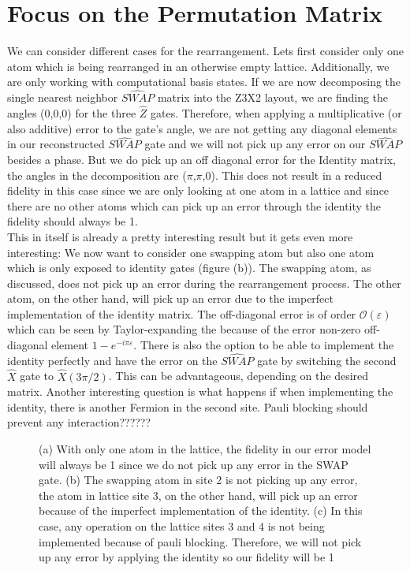 \section{Focus on the Permutation Matrix}
We can consider different cases for the rearrangement. Lets first consider only one atom which is being rearranged in an otherwise empty lattice. Additionally, we are only working with computational basis states. If we are now decomposing the single nearest neighbor $\widehat{SWAP}$ matrix into the Z3X2 layout, we are finding the angles (0,0,0) for the three $\widehat{Z}$ gates. Therefore, when applying a multiplicative (or also additive) error to the gate's angle, we are not getting any diagonal elements in our reconstructed $\widehat{SWAP}$ gate and we will not pick up any error on our $\widehat{SWAP}$ besides a phase. But we do pick up an off diagonal error for the Identity matrix, the angles in the decomposition are ($\pi$,$\pi$,0). This does not result in a reduced fidelity in this case since we are only looking at one atom in a lattice and since there are no other atoms which can pick up an error through the identity the fidelity should always be 1. \\
This in itself is already a pretty interesting result but it gets even more interesting: We now want to consider one swapping atom but also one atom which is only exposed to identity gates (figure (b)). The swapping atom, as discussed, does not pick up an error during the rearrangement process. The other atom, on the other hand, will pick up an error due to the imperfect implementation of the identity matrix. The off-diagonal error is of order $\mathcal{O}(\varepsilon)$ which can be seen by Taylor-expanding the because of the error non-zero off-diagonal element $1-e^{-i\pi\varepsilon}$. There is also the option to be able to implement the identity perfectly and have the error on the $\widehat{SWAP}$ gate by switching the second $\widehat{X}$ gate to $\widehat{X}(3\pi/2)$. This can be advantageous, depending on the desired matrix.
Another interesting question is what happens if when implementing the identity, there is another Fermion in the second site. Pauli blocking should prevent any interaction??????

\begin{figure}[t]
    \centering
    \caption[]{(a) With only one atom in the lattice, the fidelity in our error model will always be 1 since we do not pick up any error in the SWAP gate. (b) The swapping atom in site 2 is not picking up any error, the atom in lattice site 3, on the other hand, will pick up an error because of the imperfect implementation of the identity. (c) In this case, any operation on the lattice sites 3 and 4 is not being implemented because of pauli blocking. Therefore, we will not pick up any error by applying the identity so our fidelity will be 1}
    \label{fig:enter-label}
\end{figure}